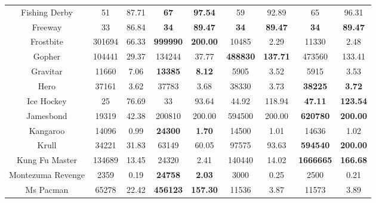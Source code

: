 \documentclass[nohyperref]{article}
\newcommand{\best}[1]{\textbf{#1}}
\theoremstyle{plain}
\begin{document}
\begin{table}[!hb]
\begin{center}
\begin{tabular}{| c | c c |  c c| c c| c c|}
 Fishing Derby   &51           &87.71               &\textbf{67}            &\textbf{97.54 }                & 59                &92.89          &65        &96.31  \\
 Freeway         &33           &86.84               &\textbf{34}            &\textbf{89.47 }                & \best{34}         &\best{89.47}   &\textbf{34}        &\textbf{89.47}         \\
 Frostbite       &301694       &66.33               &\textbf{999990}       &\textbf{200.00}                & 10485             &2.29            &11330     &2.48\\
 Gopher          &104441       &29.37               &134244                &37.77                          & \best{488830}     &\best{137.71}   &473560    &133.41       \\
 Gravitar        &11660        &7.06                &\textbf{13385}        &\textbf{8.12}                  & 5905              &3.52            &5915      &3.53\\
 Hero            &37161        &3.62                &37783                  &3.68                           &38330      &3.73    &\textbf{38225}     &\textbf{3.72}       \\
 Ice Hockey      &25           &76.69               &33                     &93.64                          &44.92              &118.94       &\textbf{47.11}           &\textbf{123.54}          \\
 Jamesbond       &19319        &42.38               &200810                &200.00                         &594500              &200.00   &\textbf{620780}          &\textbf{200.00}     \\
 Kangaroo        &14096        &0.99                &\textbf{24300}        &\textbf{1.70}                  & 14500             &1.01            &14636              &1.02\\
 Krull           &34221        &31.83               &63149                 &60.05                          & 97575      &93.63    &\textbf{594540}    &\textbf{200.00}       \\
 Kung Fu Master  &134689       &13.45               &24320                 &2.41                           & 140440     &14.02    &\textbf{1666665}          &\textbf{166.68}        \\
 Montezuma Revenge  &2359      &0.19                &\textbf{24758}        &\textbf{2.03}                  & 3000              &0.25            &2500            &0.21\\
 Ms Pacman          &65278     &22.42               &\textbf{456123}       &\textbf{157.30}                & 11536             &3.87            &11573           &3.89\\

\end{tabular}
\end{center}
\end{table}
\end{document}
